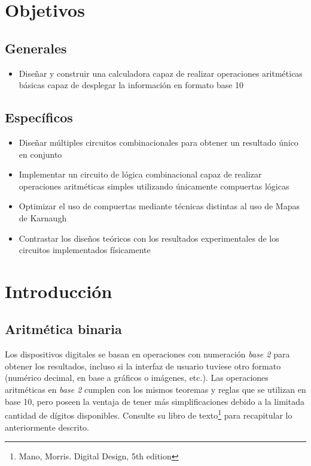 
\section*{Objetivos}
\subsection*{Generales}
\begin{itemize}
    \item Diseñar y construir una calculadora capaz de realizar operaciones aritméticas básicas capaz de desplegar la información en formato base 10
\end{itemize}

\subsection*{Específicos}
\begin{itemize}
    \item Diseñar múltiples circuitos combinacionales para obtener un resultado único en conjunto
    \item Implementar un circuito de lógica combinacional capaz de realizar operaciones aritméticas simples utilizando únicamente compuertas lógicas
    \item Optimizar el uso de compuertas mediante técnicas distintas al uso de Mapas de Karnaugh
    \item Contrastar los diseños teóricos con los resultados experimentales de los circuitos implementados físicamente
\end{itemize}

\section{Introducción}

\subsection{Aritmética binaria}
Los dispositivos digitales se basan en operaciones con numeración \emph{base 2} para obtener los resultados, incluso si la interfaz de usuario tuviese otro 
formato (numérico decimal, en base a gráficos o imágenes, etc.). Las operaciones aritméticas en \emph{base 2} cumplen con los mismos teoremas y reglas que se
utilizan en base 10, pero poseen la ventaja de tener más simplificaciones debido a la limitada cantidad de dígitos disponibles. Consulte su libro de
texto\footnote{Mano, Morris. Digital Design, 5th edition} para recapitular lo anteriormente descrito.

